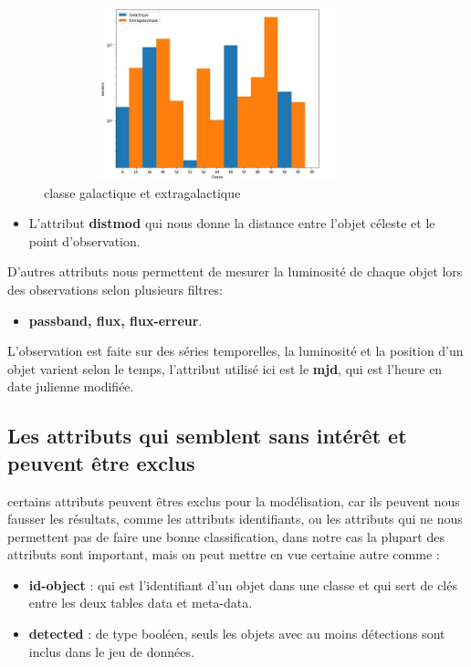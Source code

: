 \begin{figure}[!h]
    \centering
    \includegraphics[width=10cm,height=5cm]{report/figures/galactic.jpg}
    \caption{classe galactique et extragalactique}
    \label{fig:my_label}
\end{figure}
\newline
\begin{itemize}
    \item L’attribut \textbf{distmod} qui nous donne la distance entre l’objet céleste et le point d’observation.
\end{itemize}



\newline
D’autres attributs nous permettent de mesurer la luminosité de chaque objet lors des observations selon plusieurs filtres: 
\begin{itemize}
    \item \textbf{passband, flux, flux-erreur}.
\end{itemize}
\newline
L’observation est faite sur des séries temporelles, la luminosité et la position d’un objet varient selon le temps, l’attribut utilisé ici est le \textbf{mjd}, qui est l’heure en date julienne modifiée.

\subsection{Les attributs qui semblent sans intérêt et peuvent être exclus}
certains attributs peuvent êtres exclus pour la modélisation, car ils peuvent nous fausser les résultats, comme les attributs identifiants, ou les attributs qui ne nous permettent pas de faire une bonne classification, dans notre cas la plupart des attributs sont important, mais on peut mettre en vue certaine autre comme :
\begin{itemize}
    \item \textbf{id-object }: qui est l’identifiant d’un objet dans une classe et qui sert de clés entre les deux tables data et meta-data.
    \item \textbf{detected }: de type booléen, seuls les objets avec au moins détections sont inclus dans le jeu de données.
\end{itemize}
